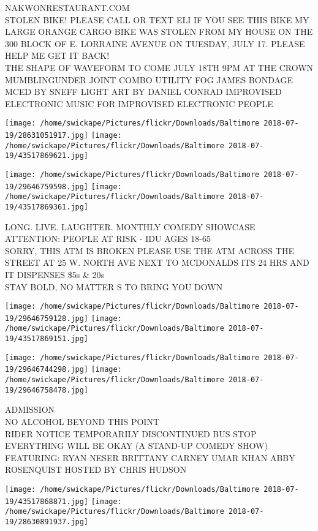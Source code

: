 \documentclass[10pt,letterpaper]{article}
\begin{document}
NAKWONRESTAURANT.COM\\
STOLEN BIKE!  PLEASE CALL OR TEXT ELI IF YOU SEE THIS BIKE MY LARGE ORANGE CARGO BIKE WAS STOLEN FROM MY HOUSE ON THE 300 BLOCK OF E. LORRAINE AVENUE ON TUESDAY, JULY 17.  PLEASE HELP ME GET IT BACK!\\
THE SHAPE OF WAVEFORM TO COME JULY 18TH 9PM AT THE CROWN MUMBLINGUNDER JOINT COMBO UTILITY FOG JAMES BONDAGE MCED BY SNEFF LIGHT ART BY DANIEL CONRAD IMPROVISED ELECTRONIC MUSIC FOR IMPROVISED ELECTRONIC PEOPLE
\pagebreak

\texttt{[image: /home/swickape/Pictures/flickr/Downloads/Baltimore 2018-07-19/28631051917.jpg]}
\texttt{[image: /home/swickape/Pictures/flickr/Downloads/Baltimore 2018-07-19/43517869621.jpg]}

\texttt{[image: /home/swickape/Pictures/flickr/Downloads/Baltimore 2018-07-19/29646759598.jpg]}
\texttt{[image: /home/swickape/Pictures/flickr/Downloads/Baltimore 2018-07-19/43517869361.jpg]}

LONG. LIVE. LAUGHTER.  MONTHLY COMEDY SHOWCASE\\
ATTENTION: PEOPLE AT RISK {-} IDU AGES 18{-}65\\
SORRY, THIS ATM IS BROKEN PLEASE USE THE ATM ACROSS THE STREET AT 25 W. NORTH AVE NEXT TO MCDONALDS ITS 24 HRS AND IT DISPENSES \$5s \& 20s\\
STAY BOLD, NO MATTER S TO BRING YOU DOWN
\pagebreak

\texttt{[image: /home/swickape/Pictures/flickr/Downloads/Baltimore 2018-07-19/29646759128.jpg]}
\texttt{[image: /home/swickape/Pictures/flickr/Downloads/Baltimore 2018-07-19/43517869151.jpg]}

\texttt{[image: /home/swickape/Pictures/flickr/Downloads/Baltimore 2018-07-19/29646744298.jpg]}
\texttt{[image: /home/swickape/Pictures/flickr/Downloads/Baltimore 2018-07-19/29646758478.jpg]}

ADMISSION\\
NO ALCOHOL BEYOND THIS POINT\\
RIDER NOTICE TEMPORARILY DISCONTINUED BUS STOP\\
EVERYTHING WILL BE OKAY (A STAND{-}UP COMEDY SHOW) FEATURING: RYAN NESER BRITTANY CARNEY UMAR KHAN ABBY ROSENQUIST HOSTED BY CHRIS HUDSON
\pagebreak

\texttt{[image: /home/swickape/Pictures/flickr/Downloads/Baltimore 2018-07-19/43517868871.jpg]}
\texttt{[image: /home/swickape/Pictures/flickr/Downloads/Baltimore 2018-07-19/28630891937.jpg]}
\end{document}
